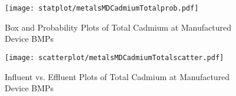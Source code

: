         \begin{figure}[hb]   %
            \centering
            \texttt{[image: statplot/metalsMDCadmiumTotalprob.pdf]}
            \caption{Box and Probability Plots of Total Cadmium at Manufactured Device BMPs}
        \end{figure}         %
        
        
        \begin{figure}[hb]   %
            \centering
            \texttt{[image: scatterplot/metalsMDCadmiumTotalscatter.pdf]}
            \caption{Influent vs. Effluent Plots of Total Cadmium at Manufactured Device BMPs}
        \end{figure}         %
        \clearpage
        